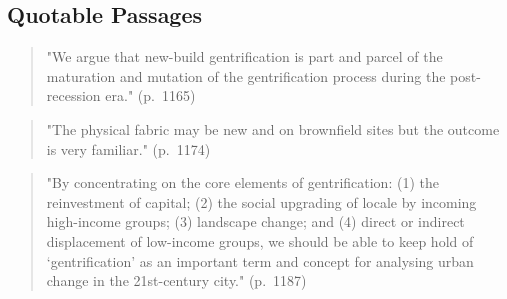\subsection*{Quotable Passages}

\begin{quote}
"We argue that new-build gentrification is part and parcel of the maturation and mutation of the gentrification process during the post-recession era." (p.~1165)
\end{quote}

\begin{quote}
"The physical fabric may be new and on brownfield sites but the outcome is very familiar." (p.~1174)
\end{quote}

\begin{quote}
"By concentrating on the core elements of gentrification: (1) the reinvestment of capital; (2) the social upgrading of locale by incoming high-income groups; (3) landscape change; and (4) direct or indirect displacement of low-income groups, we should be able to keep hold of `gentrification' as an important term and concept for analysing urban change in the 21st-century city." (p.~1187)
\end{quote}
